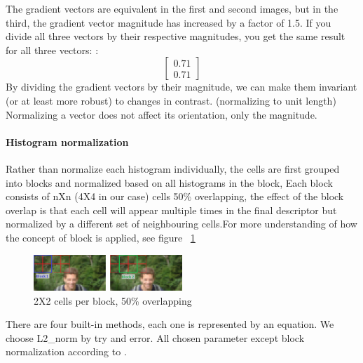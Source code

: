 The gradient vectors are equivalent in the first and second images, but in the third, the gradient vector magnitude has increased by a factor of 1.5. \newline
If you divide all three vectors by their respective magnitudes, you get the same result for all three vectors:
:\[ \begin{bmatrix}
0.71\\0.71
\end{bmatrix} \]
\newline
By dividing the gradient vectors by their magnitude, we can make them invariant (or at least more robust) to changes in contrast. (normalizing to unit length)
\newline Normalizing a vector does not affect its orientation, only the magnitude.
\paragraph{Histogram normalization} Rather than normalize each histogram individually, the cells are first grouped into blocks and normalized based on all histograms in the block, Each block consists of nXn (4X4 in our case) cells 50\% overlapping, the effect of the block overlap is that each cell will appear multiple times in the final descriptor but normalized by a different set of neighbouring cells.For more understanding of how the concept of block is applied, see figure ~\ref{fig:block normalization}
\begin{figure}
	\centering
	\includegraphics[width=0.5\textwidth]{images/blocks.png}
	\caption{2X2 cells per block, 50\% overlapping}
	\label{fig:block normalization}
\end{figure}
There are four built-in methods, each one is represented by an equation.
\newline We choose L2\_norm by try and error.\newline
All chosen parameter except block normalization according to \cite{hog}.